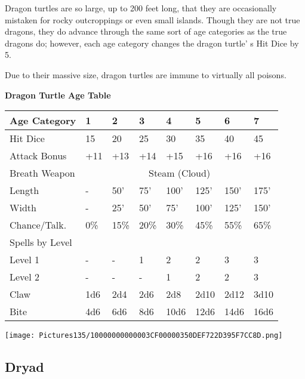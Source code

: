 \documentclass[a4paper,twoside,openany,10pt]{book}
\begin{document}
\begin{multicols}{2}
Dragon turtles are so large, up to 200 feet long, that they are occasionally mistaken for rocky outcroppings or even small islands. Though they are not true dragons, they do advance through the same sort of age categories as the true dragons do; however, each age category changes the dragon turtle' s Hit Dice by 5.

Due to their massive size, dragon turtles are immune to virtually all poisons.


\begin{center}
\textbf{Dragon Turtle Age Table}\\

\begin{tabularx}{0.47\textwidth}{@{}lXXXXXXX@{}}
Age Category & 1 & 2 & 3 & 4 & 5 & 6 & 7 \\\hline
Hit Dice & 15 & 20 & 25 & 30 & 35 & 40 & 45 \\\hline
Attack Bonus & +11 & +13 & +14 & +15 & +16 & +16 & +16 \\\hline
Breath Weapon & \multicolumn{7}{c}{Steam (Cloud)}\\\hline
Length & - & 50' & 75' & 100' & 125' & 150' & 175' \\\hline
Width & - & 25' & 50' & 75' & 100' & 125' & 150' \\\hline 
Chance/Talk. & 0\% & 15\% & 20\% & 30\% & 45\% & 55\% & 65\% \\\hline
Spells by Level & & & & & & & \\\hline
Level 1 & - & - & 1 & 2 & 2 & 3 & 3 \\\hline
Level 2 & - & - & - & 1 & 2 & 2 & 3 \\\hline
Claw & 1d6 & 2d4 & 2d6 & 2d8 & 2d10 & 2d12 & 3d10 \\\hline
Bite & 4d6 & 6d6 & 8d6 & 10d6 & 12d6 & 14d6 & 16d6 \\\hline
\end{tabularx}
\end{center}


\begin{center}
	\texttt{[image: Pictures135/10000000000003CF00000350DEF722D395F7CC8D.png]}	
\end{center}

\columnbreak

\subsection*{Dryad}\label{dryad}


\end{multicols}
\end{document}
